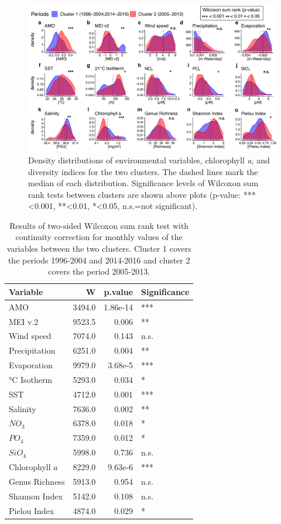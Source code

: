 \documentclass[draft]{agujournal2019}
\begin{document}
    \begin{figure}
    \noindent\includegraphics[width=\textwidth]{fig/Figure5_ClustCompPlot_v2.pdf}
    \caption{Density distributions of environmental variables, chlorophyll \textit{a}, and diversity indices for the two clusters. The dashed lines mark the median of each distribution. Significance levels of Wilcoxon sum rank tests between clusters are shown above plots  (p-value: ***\textless0.001, **\textless0.01, *\textless0.05, n.s.=not significant).}
    \label{fig:clustcomp}
    \end{figure}

    \begin{table}
    \caption{Results of two-sided Wilcoxon sum rank test with continuity correction for monthly values of the variables between the two clusters. Cluster 1 covers the periods 1996-2004 and 2014-2016 and cluster 2 covers the period 2005-2013.}
    \centering
    \begin{tabular}[t]{lrrl}
    \toprule
    Variable & W & p.value & Significance\\
    \midrule
    AMO & 3494.0 & 1.86e-14 & ***\\
    MEI v.2 & 9523.5 & 0.006 & **\\
    Wind speed & 7074.0 & 0.143 & n.s.\\
    Precipitation & 6251.0 & 0.004 & **\\
    Evaporation & 9979.0 & 3.68e-5 & ***\\
    \addlinespace
    21 °C Isotherm & 5293.0 & 0.034 & *\\
    SST & 4712.0 & 0.001 & ***\\
    Salinity & 7636.0 & 0.002 & **\\
    $NO_3$ & 6378.0 & 0.018 & *\\
    $PO_4$ & 7359.0 & 0.012 & *\\
    $SiO_4$ & 5998.0 & 0.736 & n.s.\\
    \addlinespace
    Chlorophyll $a$ & 8229.0 & 9.63e-6 & ***\\
    Genus Richness & 5913.0 & 0.954 & n.s.\\
    Shannon Index & 5142.0 & 0.108 & n.s.\\
    Pielou Index & 4874.0 & 0.029 & *\\
    \bottomrule
    \end{tabular}
    
    \label{tab:ClustCompWilcox}
    \end{table}
    
\end{document}
